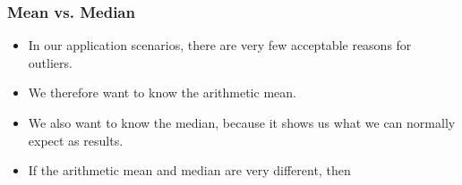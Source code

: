 \documentclass[mathserif]{beamer}%
\begin{document}
%
\begin{frame}%
\frametitle{Mean vs. Median}%
\begin{itemize}%
\item In our application scenarios, there are very few acceptable reasons for outliers.%
\item<2-> We therefore want to know the arithmetic mean.%
\item<3-> We also want to know the median, because it shows us what we can normally expect as results.%
\item<4-> If the arithmetic mean and median are very different, then%
\end{itemize}%
%
\end{frame}%
%
\endPresentation%
\end{document}
